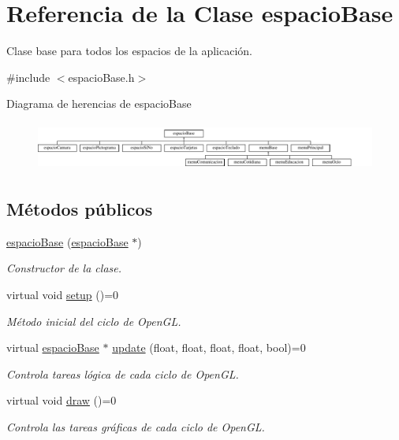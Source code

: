 \hypertarget{classespacio_base}{}\section{Referencia de la Clase espacio\+Base}
\label{classespacio_base}


Clase base para todos los espacios de la aplicación.  




{\ttfamily \#include $<$espacio\+Base.\+h$>$}

Diagrama de herencias de espacio\+Base\begin{figure}[H]
\begin{center}
\leavevmode
\includegraphics[height=1.615385cm]{classespacio_base}
\end{center}
\end{figure}
\subsection*{Métodos públicos}
\begin{DoxyCompactItemize}
\item 
\hyperlink{classespacio_base_a0edb5e65a20296d24f50f3fc007478d3}{espacio\+Base} (\hyperlink{classespacio_base}{espacio\+Base} $\ast$)
\begin{DoxyCompactList}\small\item\em Constructor de la clase. \end{DoxyCompactList}\item 
virtual void \hyperlink{classespacio_base_a65020ad1e767a235b0c227a1769c5416}{setup} ()=0
\begin{DoxyCompactList}\small\item\em Método inicial del ciclo de Open\+G\+L. \end{DoxyCompactList}\item 
virtual \hyperlink{classespacio_base}{espacio\+Base} $\ast$ \hyperlink{classespacio_base_a9b94b1106cd478dd78bc42078a36d013}{update} (float, float, float, float, bool)=0
\begin{DoxyCompactList}\small\item\em Controla tareas lógica de cada ciclo de Open\+G\+L. \end{DoxyCompactList}\item 
virtual void \hyperlink{classespacio_base_a01b3e668211b6159784f79a3f5a32d95}{draw} ()=0
\begin{DoxyCompactList}\small\item\em Controla las tareas gráficas de cada ciclo de Open\+G\+L. \end{DoxyCompactList}\end{DoxyCompactItemize}
